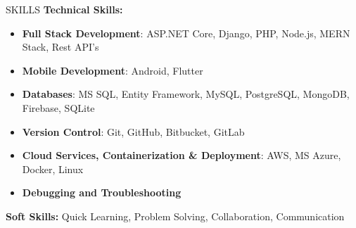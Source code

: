 \documentclass{resume} %
\begin{document}
\begin{rSection}{SKILLS}
\textbf{Technical Skills:}
\begin{itemize}
	\item \textbf{Full Stack Development}: ASP.NET Core, Django, PHP, Node.js, MERN Stack, Rest API's
	\item \textbf{Mobile Development}: Android, Flutter
	\item \textbf{Databases}: MS SQL, Entity Framework, MySQL, PostgreSQL, MongoDB, Firebase, SQLite
	\item \textbf{Version Control}: Git, GitHub, Bitbucket, GitLab
	\item \textbf{Cloud Services, Containerization \& Deployment}: AWS, MS Azure, Docker, Linux
	\item \textbf{Debugging and Troubleshooting}
	
\end{itemize}
\textbf{Soft Skills:} Quick Learning, Problem Solving, Collaboration, Communication


\end{rSection}
  
\end{document}
